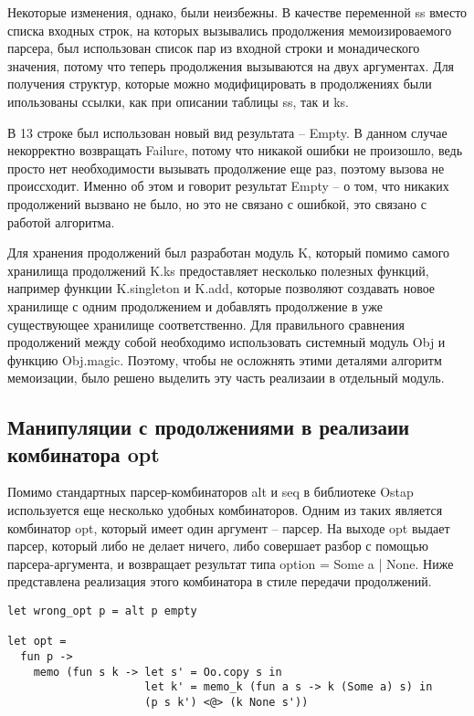 \documentclass[conference]{IEEEtran}
\begin{document}
Некоторые изменения, однако, были неизбежны. В качестве переменной ss вместо списка входных строк, на которых вызывались продолжения мемоизироваемого парсера, был использован список пар из входной строки и монадического значения, потому что теперь продолжения вызываются на двух аргументах. Для получения структур, которые можно модифицировать в продолжениях были ипользованы ссылки, как при описании таблицы ss, так и ks.

В 13 строке был использован новый вид результата -- Empty. В данном случае некорректно возвращать Failure, потому что никакой ошибки не произошло, ведь просто нет необходимости вызывать продолжение еще раз, поэтому вызова не происсходит. Именно об этом и говорит результат Empty -- о том, что никаких продолжений вызвано не было, но это не связано с ошибкой, это связано с работой алгоритма.

Для хранения продолжений был разработан модуль K, который помимо самого хранилища продолжений K.ks предоставляет несколько полезных функций, например функции K.singleton и K.add, которые позволяют создавать новое хранилище с одним продолжением и добавлять продолжение в уже существующее хранилище соответственно. Для правильного сравнения продолжений между собой необходимо использовать системный модуль Obj и функцию Obj.magic. Поэтому, чтобы не осложнять этими деталями алгоритм мемоизации, было решено выделить эту часть реализаии в отдельный модуль.

\subsection{Манипуляции с продолжениями в реализаии комбинатора opt}

Помимо стандартных парсер-комбинаторов alt и seq в библиотеке Ostap используется еще несколько удобных комбинаторов. Одним из таких является комбинатор opt, который имеет один аргумент -- парсер. На выходе opt выдает парсер, который либо не делает ничего, либо совершает разбор с помощью парсера-аргумента, и возвращает результат типа option = Some a | None. Ниже представлена реализация этого комбинатора в стиле передачи продолжений.

\begin{lstlisting}
let wrong_opt p = alt p empty

let opt =
  fun p ->
    memo (fun s k -> let s' = Oo.copy s in
                     let k' = memo_k (fun a s -> k (Some a) s) in
                     (p s k') <@> (k None s'))
\end{lstlisting}
\end{document}
